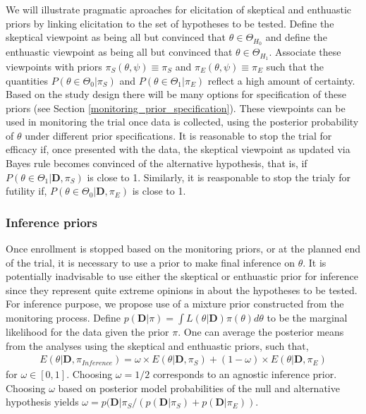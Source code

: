 \documentclass[12pt]{article}
\begin{document}
We will illustrate pragmatic aproaches for elicitation of skeptical and enthuastic priors by linking elicitation to the set of hypotheses to be tested. Define the skeptical viewpoint as being all but convinced that $\theta\in\Theta_{H_0}$ and define the enthuastic viewpoint as being all but convinced that $\theta\in\Theta_{H_1}$. Associate these viewpoints with priors $\pi_{S}(\theta,\psi)\equiv\pi_{S}$ and $\pi_{E}(\theta,\psi)\equiv\pi_{E}$ such that the quantities $P(\theta\in\Theta_0| \pi_{S})$ and $P(\theta\in\Theta_1| \pi_{E})$ reflect a high amount of certainty. Based on the study design there will be many options for specification of these priors (see Section \ref{monitoring_prior_specification}). These viewpoints can be used in monitoring the trial once data is collected, using the posterior probability of $\theta$ under different prior specifications. It is reasonable to stop the trial for efficacy if, once presented with the data, the skeptical viewpoint as updated via Bayes rule becomes convinced of the alternative hypothesis, that is, if $P(\theta\in\Theta_1|\mathbf{D}, \pi_{S})$ is close to 1. Similarly, it is reasponable to stop the trialy for futility if, $P(\theta\in\Theta_0|\mathbf{D}, \pi_{E})$ is close to 1.





\subsubsection{Inference priors}
Once enrollment is stopped based on the monitoring priors, or at the planned end of the trial, it is necessary to use a prior to make final inference on $\theta$. It is potentially inadvisable to use either the skeptical or enthuastic prior for inference since they represent quite extreme opinions in about the hypotheses to be tested. For inference purpose, we propose use of a mixture prior constructed from the monitoring process.  Define $p(\mathbf{D}|\pi)=\int L (\theta|\mathbf{D})\pi(\theta)d\theta$ to be the marginal likelihood for the data given the prior $\pi$. One can average the posterior means from the analyses using the skeptical and enthuastic priors, such that,
\begin{align*}
E(\theta|\mathbf{D},\pi_{Inference})=\omega\times E(\theta|\mathbf{D}, \pi_{S})+(1-\omega)\times E(\theta|\mathbf{D}, \pi_{E})
\end{align*}
for $\omega\in[0,1]$. Choosing $\omega=1/2$ corresponds to an agnostic inference prior. Choosing $\omega$ based on posterior model probabilities of the null and alternative hypothesis yields $\omega=p(\mathbf{D}| \pi_{S}/(p(\mathbf{D}| \pi_{S})+p(\mathbf{D}| \pi_{E}))$.
\end{document}
